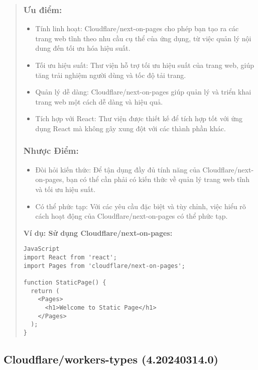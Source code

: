 \begin{quote}
\subsubsection{Ưu điểm:}
\begin{itemize}
  \item Tính linh hoạt: Cloudflare/next-on-pages cho phép bạn tạo ra các trang web tĩnh theo nhu cầu cụ thể của ứng dụng, từ việc quản lý nội dung đến tối ưu hóa hiệu suất.
  \item Tối ưu hiệu suất: Thư viện hỗ trợ tối ưu hiệu suất của trang web, giúp tăng trải nghiệm người dùng và tốc độ tải trang.
  \item Quản lý dễ dàng: Cloudflare/next-on-pages giúp quản lý và triển khai trang web một cách dễ dàng và hiệu quả.
  \item Tích hợp với React: Thư viện được thiết kế để tích hợp tốt với ứng dụng React mà không gây xung đột với các thành phần khác.
\end{itemize}

\subsubsection{Nhược Điểm:}
\begin{itemize}
  \item Đòi hỏi kiến thức: Để tận dụng đầy đủ tính năng của Cloudflare/next-on-pages, bạn có thể cần phải có kiến thức về quản lý trang web tĩnh và tối ưu hiệu suất.
  \item Có thể phức tạp: Với các yêu cầu đặc biệt và tùy chỉnh, việc hiểu rõ cách hoạt động của Cloudflare/next-on-pages có thể phức tạp.
\end{itemize}

\textbf{Ví dụ: Sử dụng Cloudflare/next-on-pages:}
\begin{lstlisting}
JavaScript
import React from 'react';
import Pages from 'cloudflare/next-on-pages';

function StaticPage() {
  return (
    <Pages>
      <h1>Welcome to Static Page</h1>
    </Pages>
  );
}
\end{lstlisting}
\end{quote}




\subsection{Cloudflare/workers-types (4.20240314.0)}

